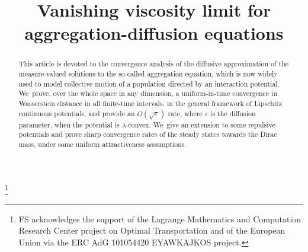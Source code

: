 \documentclass[JEP,XML,SOM,Unicode, NoFloatCountersInSection,published]{cedram}
\theoremstyle{plain}
\theoremstyle{definition}
\begin{document}
\frontmatter

\title{Vanishing viscosity limit for aggregation-diffusion equations}

\author[\initial{F.} \lastname{Lagoutière}]{ }
\address{Universite Claude Bernard Lyon 1, CNRS, École Centrale de Lyon, INSA Lyon, Université Jean Monnet, ICJ UMR5208\\
69622 Villeurbanne, France}

\author[\initial{F.} \lastname{Santambrogio}]{ }
\address{Universite Claude Bernard Lyon 1, CNRS, École Centrale de Lyon, INSA Lyon, Université Jean Monnet, ICJ UMR5208\\
69622 Villeurbanne, France}

\author[\initial{S.} \lastname{Tran Tien}]{\nobreakauthor {}}
\address{Universite Claude Bernard Lyon 1, CNRS, École Centrale de Lyon, INSA Lyon, Université Jean Monnet, ICJ UMR5208\\
69622 Villeurbanne, France}

\thanks{FS acknowledges the support of the Lagrange Mathematics and Computation Research Center project on Optimal Transportation and of the European Union via the ERC AdG 101054420 EYAWKAJKOS project.}

\begin{abstract}
This article is devoted to the convergence analysis of the diffusive approximation of the measure-valued solutions to the so-called aggregation equation, which is now widely used to model collective motion of a population directed by an interaction potential. We~prove, over the whole space in any dimension, a uniform-in-time convergence in Wasserstein distance in all finite-time intervals, in the general framework of Lipschitz continuous potentials, and provide an $O(\sqrt{\varepsilon})$ rate, where $\varepsilon$ is the diffusion parameter, when the potential is $\lambda$-convex. We~give an extension to some repulsive potentials and prove sharp convergence rates of the steady states towards the Dirac mass, under some uniform attractiveness assumptions.
\end{abstract}

\end{document}
